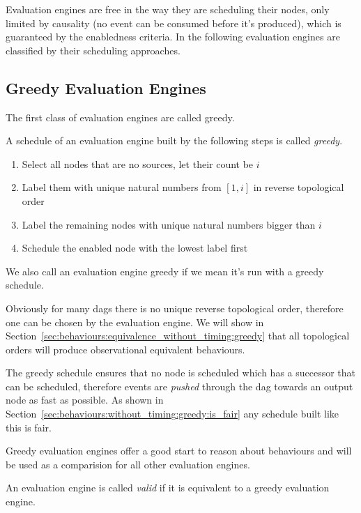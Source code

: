 Evaluation engines are free in the way they are scheduling their nodes, only limited by causality (no event can be consumed before it's produced), which is guaranteed by the enabledness criteria.
In the following evaluation engines are classified by their scheduling approaches.

\subsection{Greedy Evaluation Engines}
\label{sec:behaviours:without_timing:greedy}

The first class of evaluation engines are called greedy.

\begin{definition}[name = Greedy schedule]\label{def:greedy_schedule}
  A schedule of an evaluation engine built by the following steps is called \emph{greedy}.
  \begin{enumerate}
    \item Select all nodes that are no sources, let their count be \(i\)
    \item Label them with unique natural numbers from \([1,i]\) in reverse topological order
    \item Label the remaining nodes with unique natural numbers bigger than \(i\)
    \item Schedule the enabled node with the lowest label first
  \end{enumerate}

  We also call an evaluation engine greedy if we mean it's run with a greedy schedule.
\end{definition}

Obviously for many \glspl{dag} there is no unique reverse topological order, therefore one can be chosen by the evaluation engine.
We will show in Section~\ref{sec:behaviours:equivalence_without_timing:greedy} that all topological orders will produce observational equivalent behaviours.

The greedy schedule ensures that no node is scheduled which has a successor that can be scheduled, therefore events are \emph{pushed} through the \gls{dag} towards an output node as fast as possible.
As shown in Section~\ref{sec:behaviours:without_timing:greedy:is_fair} any schedule built like this is fair.

Greedy evaluation engines offer a good start to reason about behaviours and will be used as a comparision for all other evaluation engines.

\begin{definition}[name = Valid Evaluation Engines]\label{def:valid_eval_engine}
  An evaluation engine is called \emph{valid} if it is equivalent to a greedy evaluation engine.
\end{definition}


